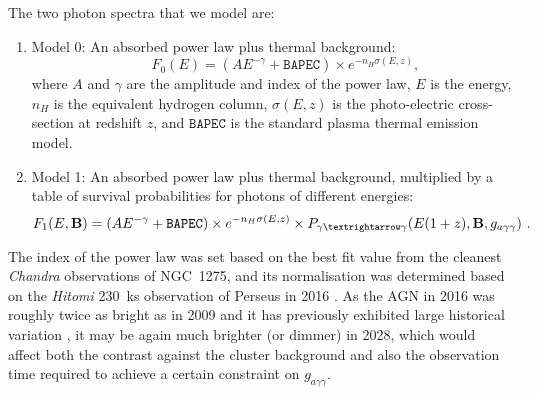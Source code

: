 \documentclass[fleqn,usenatbib,useAMS]{mnras}
\begin{document}
The two photon spectra that we model are:
\begin{enumerate}
\item Model 0: An absorbed power law plus thermal background:
\begin{equation}
\qquad F_{0}(E) = (A E^ {- \gamma} + \mathtt{BAPEC}) \times e^{-n_{H} \sigma(E,z)},
\end{equation}
where $A$ and $\gamma$ are the amplitude and index of the power law, $E$ is the energy, $n_H$ is the equivalent hydrogen column, $\sigma(E, z)$ is the photo-electric cross-section at redshift $z$, and $\mathtt{BAPEC}$ is the standard plasma thermal emission model.
\item Model 1: An absorbed power law plus thermal background, multiplied by a table of survival probabilities for photons of different energies:
\begin{equation}
F_{1}(E, {\bf B}) = (A E^ {- \gamma} + \mathtt{BAPEC}) \times e^{-n_{H} \sigma(E,z)} \times P_{\gamma \textrightarrow \gamma} (E (1 + z), { \bf B}, g_{a \gamma \gamma})~.
\end{equation}
\end{enumerate}
The index of the power law was set based on the best fit value from the cleanest {\it Chandra} observations of NGC~1275, and its normalisation was determined based on the {\it Hitomi} 230~ks observation of Perseus in 2016 \cite{Aharonian:2016gzq}. As the AGN in 2016 was
roughly twice as bright as in 2009 and it has previously exhibited large historical variation \cite{Fabian:2015kua}, it may be again much brighter (or dimmer) in 2028, which would affect both the contrast
against the cluster background and also the observation time required to achieve a certain constraint on $g_{a \gamma \gamma}$.
\end{document}
